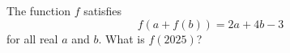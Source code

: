 The function $f$ satisfies \[f(a + f(b)) = 2a + 4b - 3\]for all real $a$ and $b$. What is $f(2025)$?

